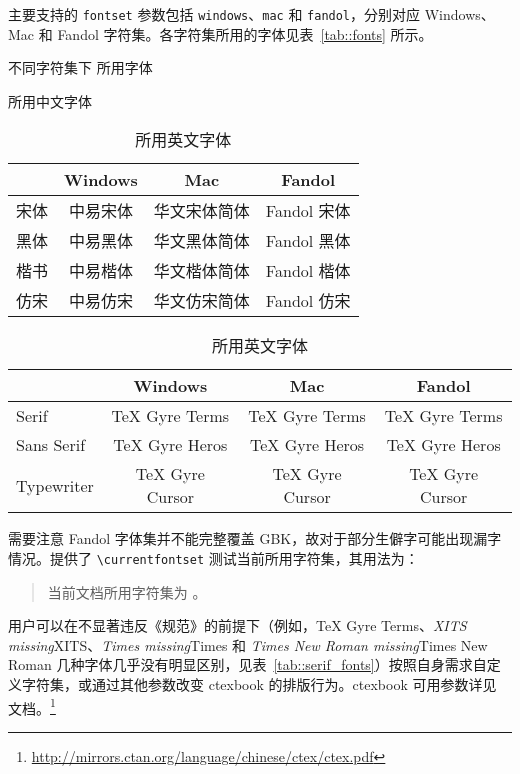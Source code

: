 \documentclass[
  fontset = mac,
]{shtthesis}
\providecommand{\timesnewroman}{\emph{Times New Roman missing}}
\providecommand{\timesfamily}{\emph{Times missing}}
\providecommand{\xitsfamily}{\emph{XITS missing}}
\begin{document}
\shtthesis 主要支持的 \verb|fontset| 参数包括 \verb|windows|、\verb|mac| 和 \verb|fandol|，分别对应 Windows、Mac 和 Fandol 字符集。各字符集所用的字体见表~\ref{tab::fonts} 所示。

\begin{table}[htb]
  \centering
  \caption{不同字符集下 \shtthesis 所用字体}
  \label{tab::fonts}
  \begin{subtable}{\columnwidth}
    \centering
    \caption{\shtthesis 所用中文字体}
    \label{tab::chs_fonts}
    \begin{tabular}{l *{3}{c}}
      \toprule
       & Windows & Mac & Fandol \\
      \midrule
      宋体 & 中易宋体 & 华文宋体简体 & Fandol 宋体 \\
      黑体 & 中易黑体 & 华文黑体简体 & Fandol 黑体 \\
      楷书 & 中易楷体 & 华文楷体简体 & Fandol 楷体 \\
      仿宋 & 中易仿宋 & 华文仿宋简体 & Fandol 仿宋 \\
      \bottomrule
    \end{tabular}
  \end{subtable}
  \newline
  \vspace{12pt}
  \newline
  \begin{subtable}{\columnwidth}
    \centering
    \caption{\shtthesis 所用英文字体}
    \label{tab::eng_fonts}
    \begin{tabular}{l *{3}{c}}
      \toprule
       & Windows & Mac & Fandol \\
      \midrule
      Serif      & TeX Gyre Terms & TeX Gyre Terms & TeX Gyre Terms \\
      Sans Serif & TeX Gyre Heros & TeX Gyre Heros & TeX Gyre Heros \\
      Typewriter & TeX Gyre Cursor & TeX Gyre Cursor & TeX Gyre Cursor \\
      \bottomrule
    \end{tabular}
  \end{subtable}
\end{table}

需要注意 Fandol 字体集并不能完整覆盖 GBK，故对于部分生僻字可能出现漏字情况。\shtthesis 提供了 \verb|\currentfontset| 测试当前所用字符集，其用法为：
\begin{quotation}
当前文档所用字符集为 \texttt{\currentfontset}。
\end{quotation}
用户可以在不显著违反《规范》的前提下（例如，{\rmfamily TeX Gyre Terms}、{\xitsfamily XITS}、{\timesfamily Times} 和 {\timesnewroman Times New Roman} 几种字体几乎没有明显区别，见表~\ref{tab::serif_fonts}）按照自身需求自定义字符集，或通过其他参数改变 \textsf{ctexbook} 的排版行为。\textsf{ctexbook} 可用参数详见 \CTeX 文档。\footnote{\url{http://mirrors.ctan.org/language/chinese/ctex/ctex.pdf}}
\end{document}
